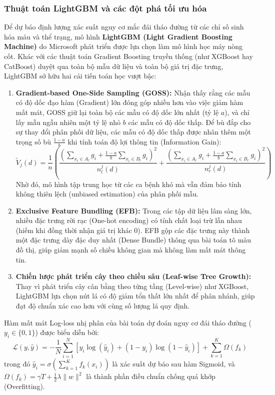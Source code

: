 \documentclass[12pt,a4paper]{article}
\begin{document}
\subsubsection{Thuật toán LightGBM và các đột phá tối ưu hóa}
Để dự báo định lượng xác suất nguy cơ mắc đái tháo đường từ các chỉ số sinh hóa máu và thể trạng, mô hình \textbf{LightGBM (Light Gradient Boosting Machine)} do Microsoft phát triển được lựa chọn làm mô hình học máy nòng cốt. Khác với các thuật toán Gradient Boosting truyền thống (như XGBoost hay CatBoost) duyệt qua toàn bộ mẫu dữ liệu và toàn bộ giá trị đặc trưng, LightGBM sở hữu hai cải tiến toán học vượt bậc:
\begin{enumerate}[leftmargin=1.2cm]
    \item \textbf{Gradient-based One-Side Sampling (GOSS):} Nhận thấy rằng các mẫu có độ dốc đạo hàm (Gradient) lớn đóng góp nhiều hơn vào việc giảm hàm mất mát, GOSS giữ lại toàn bộ các mẫu có độ dốc lớn nhất (tỷ lệ $a$), và chỉ lấy mẫu ngẫu nhiên một tỷ lệ nhỏ $b$ các mẫu có độ dốc thấp. Để bù đắp cho sự thay đổi phân phối dữ liệu, các mẫu có độ dốc thấp được nhân thêm một trọng số bù $\frac{1-a}{b}$ khi tính toán độ lợi thông tin (Information Gain):
    \begin{equation}
        \tilde{V}_j(d) = \frac{1}{n} \left( \frac{\left( \sum_{x_i \in A_l} g_i + \frac{1-a}{b} \sum_{x_i \in B_l} g_i \right)^2}{n_{l}^j(d)} + \frac{\left( \sum_{x_i \in A_r} g_i + \frac{1-a}{b} \sum_{x_i \in B_r} g_i \right)^2}{n_{r}^j(d)} \right)
    \end{equation}
    Nhờ đó, mô hình tập trung học từ các ca bệnh khó mà vẫn đảm bảo tính không thiên lệch (unbiased estimation) của phân phối mẫu.
    \item \textbf{Exclusive Feature Bundling (EFB):} Trong các tập dữ liệu lâm sàng lớn, nhiều đặc trưng rời rạc (One-hot encoding) có tính chất loại trừ lẫn nhau (hiếm khi đồng thời nhận giá trị khác 0). EFB gộp các đặc trưng này thành một đặc trưng dày đặc duy nhất (Dense Bundle) thông qua bài toán tô màu đồ thị, giúp giảm mạnh số chiều không gian mà không làm mất mát thông tin.
    \item \textbf{Chiến lược phát triển cây theo chiều sâu (Leaf-wise Tree Growth):} Thay vì phát triển cây cân bằng theo từng tầng (Level-wise) như XGBoost, LightGBM lựa chọn nút lá có độ giảm tổn thất lớn nhất để phân nhánh, giúp đạt độ chuẩn xác cao hơn với cùng số lượng lá quy định.
\end{enumerate}

Hàm mất mát Log-loss nhị phân của bài toán dự đoán nguy cơ đái tháo đường ($y_i \in \{0, 1\}$) được biểu diễn bởi:
\begin{equation}
    \mathcal{L}(y, \hat{y}) = - \frac{1}{N} \sum_{i=1}^N \left[ y_i \log(\hat{y}_i) + (1 - y_i) \log(1 - \hat{y}_i) \right] + \sum_{k=1}^K \Omega(f_k)
\end{equation}
trong đó $\hat{y}_i = \sigma(\sum_{k=1}^K f_k(x_i))$ là xác suất dự báo sau hàm Sigmoid, và $\Omega(f_k) = \gamma T + \frac{1}{2} \lambda \|w\|^2$ là thành phần điều chuẩn chống quá khớp (Overfitting).
\end{document}
